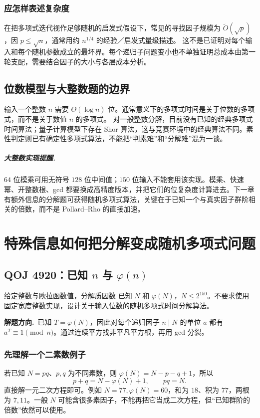 \documentclass[UTF8,a4paper,11pt,oneside,openany,fontset=fandol]{ctexbook}
\theoremstyle{definition}
\newcommand{\hint}{\par\noindent\textbf{解题方向.}\ }
\begin{document}
\subsection{应怎样表述复杂度}
在把多项式迭代视作足够随机的启发式假设下，常见的寻找因子规模为 $\widetilde O(\sqrt p)$，因 $p\le\sqrt n$，通常用约 $n^{1/4}$ 的经验／启发式量级描述。
这不是已证明对每个输入和每个随机参数成立的最坏界。每个递归子问题变小也不单独证明总成本由第一轮支配，需要结合因子的大小与各层成本分析。


\section{位数模型与大整数题的边界}
输入一个整数 $n$ 需要 $\Theta(\log n)$ 位。通常意义下的多项式时间是关于位数的多项式，而不是关于数值 $n$ 的多项式。
对一般整数分解，目前没有已知的经典多项式时间算法；量子计算模型下存在 Shor 算法，这与竞赛环境中的经典算法不同。素性判定则已有确定性多项式算法，不能把“判素难”和“分解难”混为一谈。

\paragraph{大整数实现提醒.} $64$ 位模乘可用无符号 $128$ 位中间值；$150$ 位输入不能套用该实现。模乘、快速幂、开整数根、gcd 都要换成高精度版本，并把它们的位复杂度计算进去。下一章有额外信息的分解题可获得随机多项式算法，关键在于已知一个与真实因子群阶相关的倍数，而不是 Pollard--Rho 的直接加速。



\chapter{特殊信息如何把分解变成随机多项式问题}
\section{QOJ 4920：已知 \texorpdfstring{$n$}{n} 与 \texorpdfstring{$\varphi(n)$}{phi(n)}}
\begin{problem}{给定整数与欧拉函数值，分解质因数}
已知 $N$ 和 $\varphi(N)$，$N\le2^{150}$。不要求使用固定宽度整数实现，设计关于输入位数的随机多项式时间分解算法。
\end{problem}
\hint 已知 $T=\varphi(N)$，因此对每个递归因子 $n\mid N$ 的单位 $a$ 都有 $a^T\equiv1\pmod n$。通过连续平方找非平凡平方根，再用 gcd 分裂。


\subsection{先理解一个二素数例子}
若已知 $N=pq$、$p,q$ 为不同素数，则 $\varphi(N)=N-p-q+1$，所以
\[
 p+q=N-\varphi(N)+1,\qquad pq=N.
\]
直接解一元二次方程即可。例如 $N=77,\varphi(N)=60$，和为 $18$、积为 $77$，两根为 $7,11$。一般 $N$ 可能含很多素因子，不能再把它当成二次方程，但“已知群阶的倍数”依然可以使用。
\end{document}
